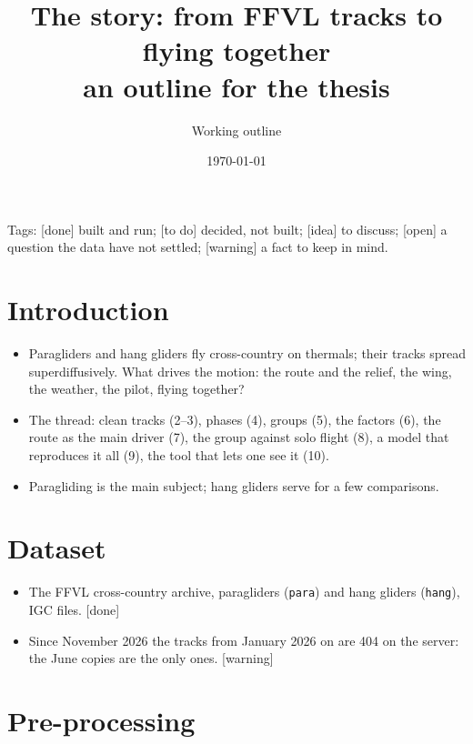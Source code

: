 \documentclass[11pt]{article}
\title{The story: from FFVL tracks to flying together\\[2pt]\large an outline for the thesis}
\author{Working outline}
\date{\today}
\newcommand{\done}{\textcolor{green!45!black}{\textsf{[done]}}}
\newcommand{\todo}{\textcolor{orange!85!black}{\textsf{[to do]}}}
\newcommand{\idea}{\textcolor{blue!70!black}{\textsf{[idea]}}}
\newcommand{\open}{\textcolor{red!70!black}{\textsf{[open]}}}
\newcommand{\warn}{\textcolor{red!70!black}{\textsf{[warning]}}}
\begin{document}
\maketitle
\setcounter{tocdepth}{1}
\tableofcontents
\bigskip

\noindent Tags: \done{} built and run; \todo{} decided, not built; \idea{} to discuss;
\open{} a question the data have not settled; \warn{} a fact to keep in mind.

\section{Introduction}

\begin{itemize}
  \item Paragliders and hang gliders fly cross-country on thermals; their tracks spread
        superdiffusively. What drives the motion: the route and the relief, the wing, the weather,
        the pilot, flying together?
  \item The thread: clean tracks (2--3), phases (4), groups (5), the factors (6), the route as the
        main driver (7), the group against solo flight (8), a model that reproduces it all (9), the
        tool that lets one see it (10).
  \item Paragliding is the main subject; hang gliders serve for a few comparisons.
\end{itemize}

\section{Dataset}

\begin{itemize}
  \item The FFVL cross-country archive, paragliders (\texttt{para}) and hang gliders
        (\texttt{hang}), IGC files. \done
  \item Since November 2026 the tracks from January 2026 on are 404 on the server: the June copies are
        the only ones. \warn
\end{itemize}

\section{Pre-processing}
\end{document}
